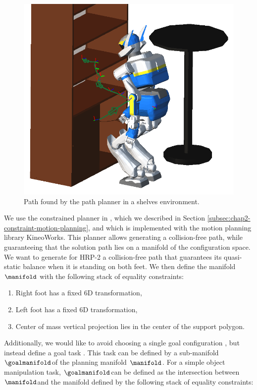 \begin{figure}
\centering
\includegraphics[width=0.8\linewidth]
                {src/chap3-optimal-motion-planning/figure/shelves-path.png}
\caption{Path found by the path planner in a shelves environment.}
\label{path}
\end{figure}

We use the constrained planner in \cite{dalibard09}, which we
described in Section \ref{subsec:chap2-constraint-motion-planning},
and which is implemented with the motion planning library
KineoWorks\texttrademark \cite{laumond2006kcs}. This planner allows
generating a collision-free path, while guaranteeing that the solution
path lies on a manifold of the configuration space. We want to
generate for HRP-2 a collision-free path that guarantees its
quasi-static balance when it is standing on both feet. We then define
the manifold $\manifold$ with the following stack of equality
constraints:

\begin{enumerate}
  \item Right foot has a fixed 6D transformation,
  \item Left foot has a fixed 6D transformation,
  \item Center of mass vertical projection lies in the center of the
    support polygon.
\end{enumerate}

Additionally, we would like to avoid choosing a single goal
configuration , but instead define a goal task
. This task can be defined by a sub-manifold
$\goalmanifold$\thinspace of the planning manifold $\manifold$. For a
simple object manipulation task, $\goalmanifold$\thinspace can be
defined as the intersection between $\manifold$\thinspace and the
manifold defined by the following stack of equality constraints:

